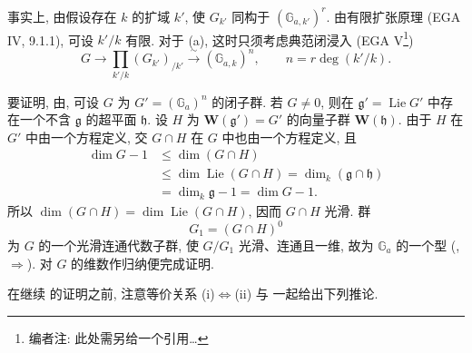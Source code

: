 
事实上, 由假设存在 \(k\) 的扩域 \(k'\), 使 \(G_{k'}\) 同构于 \((\mathbb G_{a,k'})^r\).
由有限扩张原理 (EGA IV, 9.1.1), 可设 \(k'/k\) 有限.
对于 (a), 这时只须考虑典范闭浸入 (EGA V\footnote[5]{编者注: 此处需另给一个引用\ldots})
\[
  G\longrightarrow
  \prod_{k'/k}(G_{k'})_{/k'}
  \xrightarrow{\ \sim\ }(\mathbb G_{a,k})^n,
  \qquad n=r\deg(k'/k).
\]

要证明,
由, 可设 \(G\)
为 \(G'=(\mathbb G_a)^n\) 的闭子群.
若 \(G\ne0\), 则在 \(\mathfrak g'=\operatorname{Lie}G'\) 中存在一个不含 \(\mathfrak g\)
的超平面 \(\mathfrak h\). 设 \(H\) 为 \(\mathbf W(\mathfrak g')=G'\)
的向量子群 \(\mathbf W(\mathfrak h)\).
由于 \(H\) 在 \(G'\) 中由一个方程定义, 交 \(G\cap H\) 在 \(G\) 中也由一个方程定义, 且
\[
\begin{aligned}
  \dim G-1
  &\leq \dim(G\cap H)\\
  &\leq \dim\operatorname{Lie}(G\cap H)
   =\dim_k(\mathfrak g\cap\mathfrak h)\\
  &=\dim_k\mathfrak g-1
   =\dim G-1.
\end{aligned}
\]
所以 \(\dim(G\cap H)=\dim\operatorname{Lie}(G\cap H)\),
因而 \(G\cap H\) 光滑. 群
\[
  G_1=(G\cap H)^0
\]
为 \(G\) 的一个光滑连通代数子群, 使 \(G/G_1\) 光滑、连通且一维,
故为 \(\mathbb G_a\) 的一个型
(,
\(\Rightarrow\)).
对 \(G\) 的维数作归纳便完成证明.

在继续 的证明之前,
注意等价关系 (i)\(\Leftrightarrow\)(ii) 与
一起给出下列推论.


